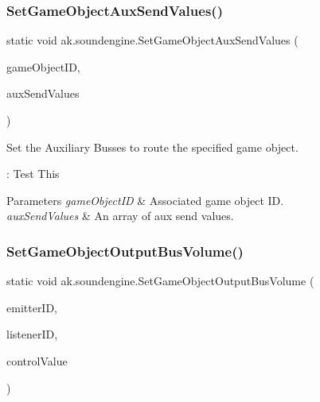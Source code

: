 \subsubsection{\texorpdfstring{Set\+Game\+Object\+Aux\+Send\+Values()}{SetGameObjectAuxSendValues()}}
{\footnotesize\ttfamily static void ak.\+soundengine.\+Set\+Game\+Object\+Aux\+Send\+Values (\begin{DoxyParamCaption}\item[{int}]{game\+Object\+ID,  }\item[{\mbox{\hyperlink{struct_waapi_c_s_1_1_custom_values_1_1_wwise_values_1_1_aux_send_values}{Wwise\+Values.\+Aux\+Send\+Values}} \mbox{[}$\,$\mbox{]}}]{aux\+Send\+Values }\end{DoxyParamCaption})\hspace{0.3cm}{\ttfamily [static]}}



Set the Auxiliary Busses to route the specified game object. 

\+: Test This


\begin{DoxyParams}{Parameters}
{\em game\+Object\+ID} & Associated game object ID.\\
\hline
{\em aux\+Send\+Values} & An array of aux send values.\\
\hline
\end{DoxyParams}
\mbox{\label{classak_1_1soundengine_a2a10b5eb429d069b3aa28893ec7777c9}} 
\subsubsection{\texorpdfstring{Set\+Game\+Object\+Output\+Bus\+Volume()}{SetGameObjectOutputBusVolume()}}
{\footnotesize\ttfamily static void ak.\+soundengine.\+Set\+Game\+Object\+Output\+Bus\+Volume (\begin{DoxyParamCaption}\item[{int}]{emitter\+ID,  }\item[{int}]{listener\+ID,  }\item[{float}]{control\+Value }\end{DoxyParamCaption})\hspace{0.3cm}{\ttfamily [static]}}



